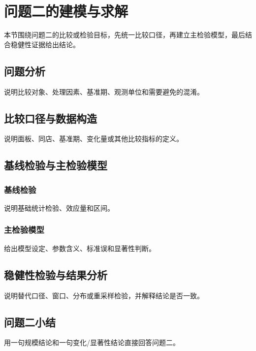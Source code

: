 \section{问题二的建模与求解}

本节围绕问题二的比较或检验目标，先统一比较口径，再建立主检验模型，最后结合稳健性证据给出结论。

\subsection{问题分析}
说明比较对象、处理因素、基准期、观测单位和需要避免的混淆。

\subsection{比较口径与数据构造}
说明面板、同店、基准期、变化量或其他比较指标的定义。

\subsection{基线检验与主检验模型}
\subsubsection{基线检验}
说明基础统计检验、效应量和区间。

\subsubsection{主检验模型}
给出模型设定、参数含义、标准误和显著性判断。

\subsection{稳健性检验与结果分析}
说明替代口径、窗口、分布或重采样检验，并解释结论是否一致。

\subsection{问题二小结}
用一句规模结论和一句变化/显著性结论直接回答问题二。
